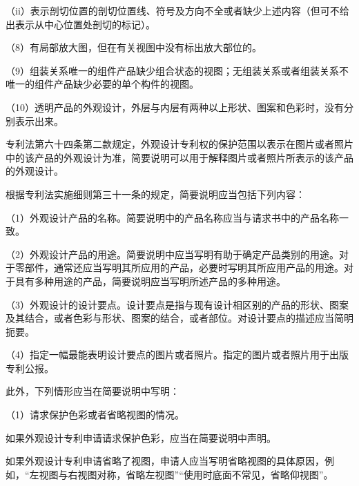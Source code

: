 {\setlength{\parindent}{17.1bp}（ii）表示剖切位置的剖切位置线、符号及方向不全或者缺少上述内容（但可不给出表示从中心位置处剖切的标记）。\par}

{\setlength{\parindent}{17.1bp}（8）有局部放大图，但在有关视图中没有标出放大部位的。\par}

{\setlength{\parindent}{17.1bp}（9）组装关系唯一的组件产品缺少组合状态的视图；无组装关系或者组装关系不唯一的组件产品缺少必要的单个构件的视图。\par}

{\setlength{\parindent}{17.1bp}（10）透明产品的外观设计，外层与内层有两种以上形状、图案和色彩时，没有分别表示出来。\par}

专利法第六十四条第二款规定，外观设计专利权的保护范围以表示在图片或者照片中的该产品的外观设计为准，简要说明可以用于解释图片或者照片所表示的该产品的外观设计。

根据专利法实施细则第三十一条的规定，简要说明应当包括下列内容：

{\setlength{\parindent}{17.1bp}（1）外观设计产品的名称。简要说明中的产品名称应当与请求书中的产品名称一致。\par}

{\setlength{\parindent}{17.1bp}（2）外观设计产品的用途。简要说明中应当写明有助于确定产品类别的用途。对于零部件，通常还应当写明其所应用的产品，必要时写明其所应用产品的用途。对于具有多种用途的产品，简要说明应当写明所述产品的多种用途。\par}

{\setlength{\parindent}{17.1bp}（3）外观设计的设计要点。设计要点是指与现有设计相区别的产品的形状、图案及其结合，或者色彩与形状、图案的结合，或者部位。对设计要点的描述应当简明扼要。\par}

{\setlength{\parindent}{17.1bp}（4）指定一幅最能表明设计要点的图片或者照片。指定的图片或者照片用于出版专利公报。\par}

此外，下列情形应当在简要说明中写明：

{\setlength{\parindent}{17.1bp}（1）请求保护色彩或者省略视图的情况。\par}

如果外观设计专利申请请求保护色彩，应当在简要说明中声明。

如果外观设计专利申请省略了视图，申请人应当写明省略视图的具体原因，例如，“左视图与右视图对称，省略左视图”“使用时底面不常见，省略仰视图”。

